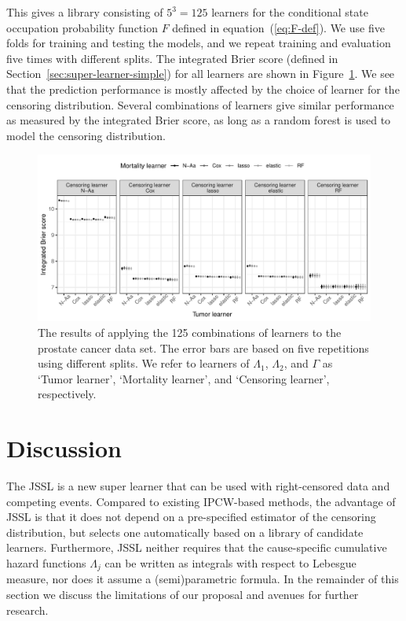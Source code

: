 \documentclass[a4paper,danish]{article}
\theoremstyle{plain} %
\numberwithin{theorem}{section}
\theoremstyle{definition} %
\theoremstyle{remark}
\newcommand{\1}{\mathds{1}}
\begin{document}
This gives a library consisting of \( 5^3 = 125 \) learners for the
conditional state occupation probability function \( F \) defined in
equation~(\ref{eq:F-def}). We use five folds for training and testing
the models, and we repeat training and evaluation five times with
different splits.  The integrated Brier score (defined in
Section~\ref{sec:super-learner-simple}) for all learners are shown in
Figure~\ref{fig:zelefski-real}. We see that the prediction
performance is mostly affected by the choice of learner for the
censoring distribution. Several combinations of learners give similar
performance as measured by the integrated Brier score, as long as a
random forest is used to model the censoring distribution.

\begin{figure}
  \centering %
  \includegraphics[width=1\linewidth]{real-data-state-learner.pdf}
  \caption[]{The results of applying the 125 combinations of learners to the
    prostate cancer data set. The error bars are based on five repetitions using
    different splits. We refer to learners of \( \Lambda_1 \), \( \Lambda_2 \),
    and $\Gamma$ as `Tumor learner', `Mortality learner', and `Censoring
    learner', respectively.}
  \label{fig:zelefski-real}
\end{figure}


\section{Discussion}
\label{sec:discussion}

The JSSL is a new super learner that can be used with
right-censored data and competing events. Compared to existing
IPCW-based methods, the advantage of JSSL is that
it does not depend on a pre-specified estimator of the
censoring distribution, but selects one automatically based on
a library of candidate learners. Furthermore, JSSL neither requires that the cause-specific cumulative
hazard functions \( \Lambda_j \) can be written as integrals
with respect to Lebesgue measure, nor does it assume a
(semi)parametric formula. In the remainder of this section
we discuss the limitations of our proposal and avenues for
further research.
\end{document}
